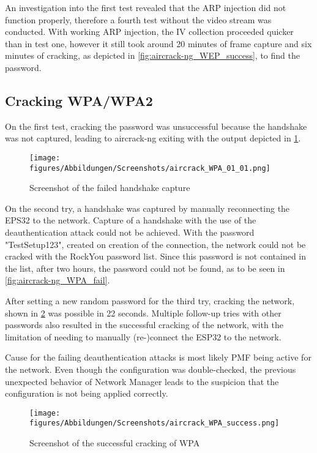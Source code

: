 An investigation into the first test revealed that the ARP injection did not function properly, therefore a fourth test without the video stream was conducted.
With working ARP injection, the IV collection proceeded quicker than in test one, however it still took around 20 minutes of frame capture and six minutes of cracking, as depicted in \cref{fig:aircrack-ng_WEP_success}, to find the password.

\newpage
\subsection{Cracking WPA/WPA2}
On the first test, cracking the password was unsuccessful because the handshake was not captured, leading to aircrack-ng exiting with the output depicted in \cref{fig:aircrack-ng_WPA_handshake}.

\begin{figure}[h]
    \centering
    \texttt{[image: figures/Abbildungen/Screenshots/aircrack\_WPA\_01\_01.png]}
    \caption{Screenshot of the failed handshake capture}
    \label{fig:aircrack-ng_WPA_handshake}
\end{figure}

On the second try, a handshake was captured by manually reconnecting the EPS32 to the network.
Capture of a handshake with the use of the deauthentication attack could not be achieved.
With the password "TestSetup123", created on creation of the connection, the network could not be cracked with the RockYou password list.
Since this password is not contained in the list, after two hours, the password could not be found, as to be seen in \cref{fig:aircrack-ng_WPA_fail}.

After setting a new random password for the third try, cracking the network, shown in \cref{fig:aircrack-ng_WPA_success} was possible in 22 seconds.
Multiple follow-up tries with other passwords also resulted in the successful cracking of the network, with the limitation of needing to manually (re-)connect the ESP32 to the network.

Cause for the failing deauthentication attacks is most likely PMF being active for the network.
Even though the configuration was double-checked, the previous unexpected behavior of Network Manager leads to the suspicion that the configuration is not being applied correctly.

\begin{figure}[h]
    \centering
    \texttt{[image: figures/Abbildungen/Screenshots/aircrack\_WPA\_success.png]}
    \caption{Screenshot of the successful cracking of WPA}
    \label{fig:aircrack-ng_WPA_success}
\end{figure}
